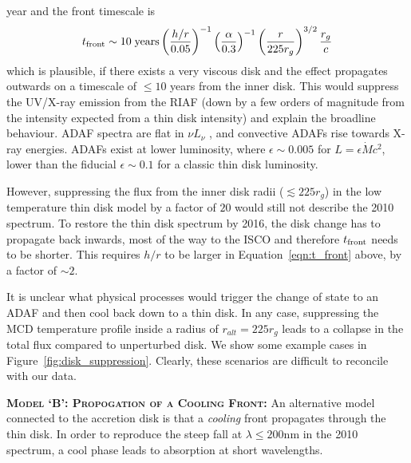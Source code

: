 \documentclass[11pt,a4paper]{article}
\begin{document}
year and the front timescale is
\begin{equation}
    t_{\rm front}  \sim  10 \; {\rm years} \left(\frac{h/r}{0.05}\right)^{-1}
                                                           \left(\frac{\alpha}{0.3}\right)^{-1}  
                                                           \left(\frac{r}{225r_{g}}\right)^{3/2}  
                                                           \frac{r_{g}}{c}
\label{eqn:t_front}
\end{equation}
which is plausible, if there exists a very viscous disk and the effect
propagates outwards on a timescale of $\leq 10$ years from the inner
disk. This would suppress the UV/X-ray emission from the RIAF (down by
a few orders of magnitude from the intensity expected from a thin disk
intensity) and explain the broadline behaviour.  ADAF spectra are flat
in $\nu L_{\nu}$ \citet{Narayan1998, Abramowicz2002, Abramowicz2013},
and convective ADAFs rise towards X-ray energies. ADAFs exist at lower
luminosity, where $\epsilon \sim 0.005$ for $L=\epsilon \dot{M}
c^{2}$, lower than the fiducial $\epsilon \sim 0.1$ for a classic thin
disk luminosity.

However, suppressing the flux from the inner disk radii ($\lesssim 225 r_{g}$)
in the low temperature thin disk model \citep{Narayan1997, Gammie1999,
Agol_Krolik2000, Afshordi_Paczynski2003, Ford2018} by a factor of
$20$ would still not describe the 2010 spectrum. To restore the thin disk
spectrum by 2016, the disk change has to propagate back inwards, most
of the way to the ISCO and therefore $t_{\rm front}$ needs to be
shorter. This requires $h/r$ to be larger in
Equation~\ref{eqn:t_front} above, by a factor of $\sim 2$.

It is unclear what physical processes would trigger the change of
state to an ADAF and then cool back down to a thin disk. In any case,
suppressing the MCD temperature profile inside a radius of $r_{alt} =
225 r_{g}$ leads to a collapse in the total flux compared to
unperturbed disk. We show some example cases in
Figure~\ref{fig:disk_suppression}. Clearly, these scenarios are
difficult to reconcile with our data.


\smallskip \smallskip
\noindent
\textbf{\textsc{Model `B': Propogation of a Cooling Front: }}
An alternative model connected to the accretion disk is that a
\emph{cooling} front propagates through the thin disk.  In order to
reproduce the steep fall at $\lambda \leq 200$nm in the 2010 spectrum,
a cool phase leads to absorption at short wavelengths.
\end{document}
